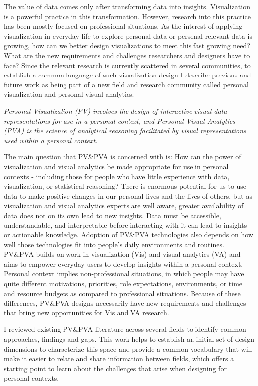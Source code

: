 \documentclass[12pt,oneside]{book}
\begin{document}
The value of data comes only after transforming data into insights.  Visualization is a powerful practice in this transformation.  However, research into this practice has been mostly focused on professional situations.  As the interest of applying visualization in everyday life to explore personal data or personal relevant data is growing, how can we better design visualizations to meet this fast growing need?  What are the new requirements and challenges researchers and designers have to face?
Since the relevant research is currently scattered in several communities, to establish a common language of such visualization design I describe previous and future work as being part of a new field and research community called personal visualization and personal visual analytics.

\textit{Personal Visualization (PV) involves the design of interactive
visual data representations for use in a personal context, and Personal Visual Analytics (PVA) is the science of analytical reasoning facilitated by visual representations used within a personal context.} 

The main question that PV\&PVA is concerned with is:  How can the power of visualization and visual analytics be made appropriate for use in personal contexts - including those for people who have little experience with data, visualization, or statistical reasoning?  There is enormous potential for us to use data to make positive changes in our personal lives and the lives of others, but as visualization and visual analytics experts are well aware, greater availability of data does not on its own lead to new insights.  Data must be accessible, understandable, and interpretable before interacting with it can lead to insights or actionable knowledge.  Adoption of PV\&PVA technologies also depends on how well those technologies fit into people's daily environments and routines.  PV\&PVA builds on work in visualization (Vis) and visual analytics (VA) and aims to empower everyday users to develop insights within a personal context.  Personal context implies non-professional situations, in which people may have quite different motivations, priorities, role expectations, environments, or time and resource budgets as compared to professional situations.  Because of these differences, PV\&PVA designs necessarily have new requirements and challenges that bring new opportunities for Vis and VA research.

I reviewed existing PV\&PVA literature across several fields to identify common approaches, findings and gaps.  This work helps to establish an initial set of design dimensions to characterize this space and provide a common vocabulary that will make it easier to relate and share information between fields, which offers a starting point to learn about the challenges that arise when designing for personal contexts.
\end{document}

